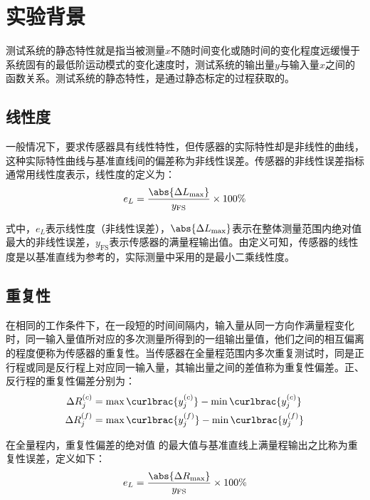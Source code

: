 \documentclass[a4paper,10.5pt,twoside]{article}%
\begin{document}
\newpage



\setcounter{page}{1}

\section{实验背景}
测试系统的静态特性就是指当被测量$x$不随时间变化或随时间的变化程度远缓慢于系统固有的最低阶运动模式的变化速度时，测试系统的输出量$y$与输入量$x$之间的函数关系。测试系统的静态特性，是通过静态标定的过程获取的。
\subsection{线性度}
一般情况下，要求传感器具有线性特性，但传感器的实际特性却是非线性的曲线，这种实际特性曲线与基准直线间的偏差称为非线性误差。传感器的非线性误差指标通常用线性度表示，线性度的定义为：
\begin{equation*}
  e_L= \frac{\abs{\Delta L_\mathrm{max}}}{y_\mathrm{FS}} \times 100\%
\end{equation*}\par
式中，$e_L$表示线性度（非线性误差），$\abs{\Delta L_\mathrm{max}}$表示在整体测量范围内绝对值最大的非线性误差，$y_\mathrm{FS}$表示传感器的满量程输出值。由定义可知，传感器的线性度是以基准直线为参考的，实际测量中采用的是最小二乘线性度。
\subsection{重复性}
在相同的工作条件下，在一段短的时间间隔内，输入量从同一方向作满量程变化时，同一输入量值所对应的多次测量所得到的一组输出量值，他们之间的相互偏离的程度便称为传感器的重复性。当传感器在全量程范围内多次重复测试时，同是正行程或同是反行程上对应同一输入量，其输出量之间的差值称为重复性偏差。正、反行程的重复性偏差分别为：
\begin{align}
  \Delta R^{(c)}_j &= \max\curlbrac{y_j^{(c)}} - \min\curlbrac{y_j^{(c)}}\\
  \Delta R^{(f)}_j &= \max\curlbrac{y_j^{(f)}} - \min\curlbrac{y_j^{(f)}}
\end{align}\par
在全量程内，重复性偏差的绝对值 的最大值与基准直线上满量程输出之比称为重复性误差，定义如下：
\begin{equation*}
  e_L= \frac{\abs{\Delta R_\mathrm{max}}}{y_\mathrm{FS}} \times 100\%
\end{equation*}\par
\end{document}
